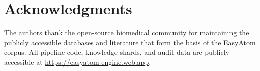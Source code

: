 \documentclass[11pt]{article}
\begin{document}
\section*{Acknowledgments}
The authors thank the open-source biomedical community for maintaining
the publicly accessible databases and literature that form the basis
of the EasyAtom corpus.
All pipeline code, knowledge shards, and audit data are publicly
accessible at \url{https://easyatom-engine.web.app}.



\end{document}
